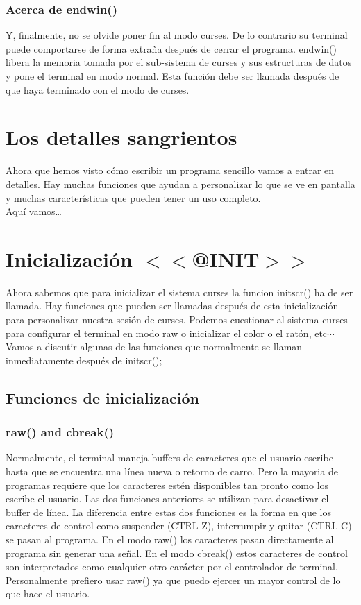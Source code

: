 \documentclass{article}
\begin{document}
\subsubsection{Acerca de endwin()}%
Y, finalmente, no se olvide poner fin al modo curses. De lo contrario su
terminal puede comportarse de forma extraña después de cerrar el programa.
endwin() libera la memoria tomada por el sub-sistema de curses y sus
estructuras de datos y pone el terminal en modo normal. Esta función debe ser
llamada después de que haya terminado con el modo de curses.

\section{Los detalles sangrientos}%
Ahora que hemos visto cómo escribir un programa sencillo vamos a entrar en
detalles. Hay muchas funciones que ayudan a personalizar lo que se ve en
pantalla y muchas características que pueden tener un uso completo.\\

Aquí vamos…

\section{Inicialización $<<$@INIT$>>$}%
Ahora sabemos que para inicializar el sistema curses la funcion initscr() ha de
ser llamada. Hay funciones que pueden ser llamadas después de esta
inicialización para personalizar nuestra sesión de curses. Podemos cuestionar
al sistema curses para configurar el terminal en modo raw o inicializar el
color o el ratón, etc$\cdots$ Vamos a discutir algunas de las funciones que
normalmente se llaman inmediatamente después de initscr();

\subsection{Funciones de inicialización}%
\subsubsection{raw() and cbreak()}%
Normalmente, el terminal maneja buffers de caracteres que el usuario escribe
hasta que se encuentra una línea nueva o retorno de carro. Pero la mayoria de
programas requiere que los caracteres estén disponibles tan pronto como los
escribe el usuario. Las dos funciones anteriores se utilizan para desactivar el
buffer de línea. La diferencia entre estas dos funciones es la forma en que los
caracteres de control como suspender (CTRL-Z), interrumpir y quitar (CTRL-C) se
pasan al programa. En el modo raw() los caracteres pasan directamente al
programa sin generar una señal. En el modo cbreak() estos caracteres de control
son interpretados como cualquier otro carácter por el controlador de terminal.
Personalmente prefiero usar raw() ya que puedo ejercer un mayor control de lo
que hace el usuario.
\end{document}
